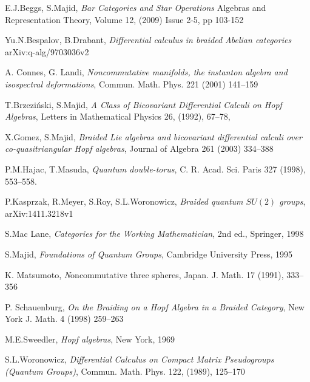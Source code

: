 \documentclass[12pt]{amsart}
\theoremstyle{definition}
\numberwithin{equation}{section}
\begin{document}
\begin{thebibliography}{}
 E.J.Beggs, S.Majid, 
\emph{Bar Categories and Star Operations }
Algebras and Representation Theory, 
Volume 12, (2009) Issue 2-5, pp 103-152 

Yu.N.Bespalov, B.Drabant,
\emph{Differential calculus in braided Abelian categories}
arXiv:q-alg/9703036v2

A. Connes, G. Landi, 
{\em Noncommutative manifolds, the instanton algebra and isospectral deformations}, Commun. Math. Phys. 221 (2001) 141--159

T.Brzezi\'nski, S.Majid,
\emph{A Class of Bicovariant Differential Calculi on Hopf Algebras},
Letters in Mathematical Physics 26, (1992), 67--78, 

   X.Gomez, S.Majid,
 \emph{Braided Lie algebras and bicovariant differential
calculi over co-quasitriangular Hopf algebras}, 
Journal of Algebra 261 (2003) 334--388

P.M.Hajac, T.Masuda, 
\emph{Quantum double-torus}, 
C. R. Acad. Sci. Paris 327 (1998), 553–558.

  P.Kasprzak, R.Meyer, S.Roy, S.L.Woronowicz, 
 \emph{Braided quantum $SU(2)$ groups},
arXiv:1411.3218v1

  S.Mac Lane,
  \emph{Categories for the Working Mathematician},
  2nd ed., Springer, 1998

  S.Majid,
  \emph{Foundations of Quantum Groups},
  Cambridge University Press, 1995
 
 K. Matsumoto, 
 {\emph Noncommutative three spheres}, 
 Japan. J. Math. 17 (1991), 333--356
 
P. Schauenburg, 
{\em On the Braiding on a Hopf Algebra in a Braided Category}, 
New York J. Math. 4 (1998) 259--263

  M.E.Sweedler,  \emph{Hopf algebras},  New York, 1969

  S.L.Woronowicz,
  \emph{Differential Calculus on Compact Matrix Pseudogroups (Quantum Groups)}, 
Commun. Math. Phys. 122, (1989), 125--170 

\end{thebibliography} 
\end{document}
